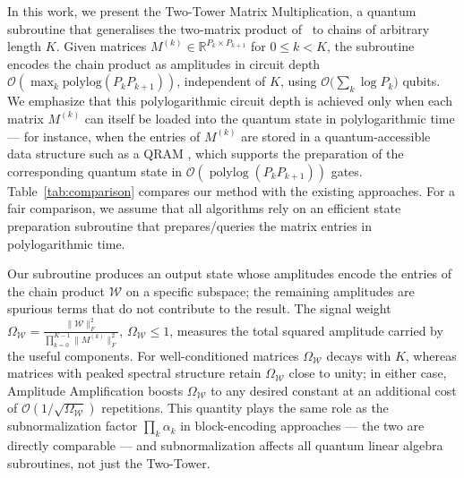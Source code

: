 \documentclass[a4paper,UKenglish,cleveref,autoref,thm-restate]{socg-lipics-v2021}
\begin{document}
In this work, we present the Two-Tower Matrix Multiplication, a quantum subroutine that generalises the two-matrix product of~\cite{bernasconiMatMul} to chains of arbitrary length $K$. Given matrices $M^{(k)} \in \mathbb{R}^{P_k \times P_{k+1}}$ for $0 \leq k < K$, the subroutine encodes the chain product as amplitudes in circuit depth $\mathcal{O}(\max_k \mathrm{polylog}(P_k P_{k+1}))$, independent of $K$, using $\mathcal{O}\bigl(\sum_{k} \log P_k \bigr)$ qubits. We emphasize that this polylogarithmic circuit depth is achieved only when each matrix $M^{(k)}$ can itself be loaded into the quantum state in polylogarithmic time — for instance, when the entries of $M^{(k)}$  are stored in a quantum-accessible data structure such as a QRAM \cite{giovannetti2008quantum}, which supports the preparation of the corresponding quantum state in $\mathcal{O}(\operatorname{polylog}(P_k P_{k+1}))$ gates. Table~\ref{tab:comparison} compares our method with the existing approaches. For a fair comparison, we assume that all algorithms rely on an efficient state preparation subroutine that prepares/queries the matrix entries in polylogarithmic time.

Our subroutine produces an output state whose amplitudes encode the entries of the chain product $\mathcal{W}$ on a specific subspace; the remaining amplitudes are spurious terms that do not contribute to the result. The signal weight $\Omega_{\mathcal{W}} = \frac{\|\mathcal{W}\|_F^2}{ \prod_{k=0}^{K-1} \|M^{(k)}\|_F^2}$, $\Omega_{\mathcal{W}} \leq 1$, measures the total squared amplitude carried by the useful components. For well-conditioned matrices $\Omega_{\mathcal{W}}$ decays with $K$, whereas matrices with peaked spectral structure retain $\Omega_{\mathcal{W}}$ close to unity; in either case, Amplitude Amplification boosts $\Omega_{\mathcal{W}}$ to any desired constant at an additional cost of $\mathcal{O}(1/\sqrt{\Omega_{\mathcal{W}}})$ repetitions. This quantity plays the same role as the subnormalization factor $\prod_k \alpha_k$ in block-encoding approaches --- the two are directly comparable --- and subnormalization affects all quantum linear algebra subroutines, not just the Two-Tower.
\end{document}
